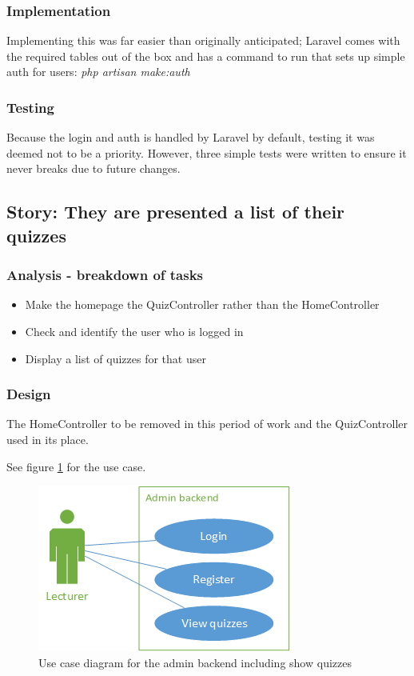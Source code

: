 \subsubsection{Implementation}
Implementing this was far easier than originally anticipated; Laravel comes with the required tables out of the box and has a command to run that sets up simple auth for users: \textit{php artisan make:auth} 
\subsubsection{Testing}
Because the login and auth is handled by Laravel by default, testing it was deemed not to be a priority. However, three simple tests were written to ensure it never breaks due to future changes.
\newpage

\subsection{Story: They are presented a list of their quizzes}
\subsubsection{Analysis - breakdown of tasks}
\begin{itemize}
	\item Make the homepage the QuizController rather than the HomeController
	\item Check and identify the user who is logged in
	\item Display a list of quizzes for that user
\end{itemize}
\subsubsection{Design}
The HomeController to be removed in this period of work and the QuizController used in its place. 

See figure \ref{fig:quiz-list-use-case} for the use case.

\begin{figure}
	\caption{Use case diagram for the admin backend including show quizzes}
	\centerline{\includegraphics{Chapter2/Iter-1/iter-1-use-case-v2}}
	\label{fig:quiz-list-use-case}
\end{figure}


